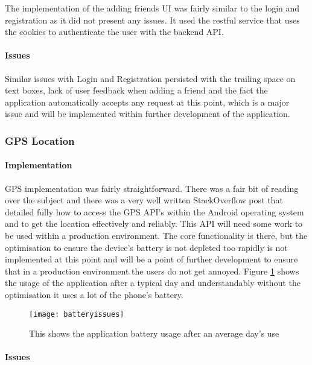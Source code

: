 The implementation of the adding friends UI was fairly similar to the login and registration as it did not present any issues. It used the restful service that uses the cookies to authenticate the user with the backend API.

\paragraph*{Issues}

Similar issues with Login and Registration persisted with the trailing space on text boxes, lack of user feedback when adding a friend and the fact the application automatically accepts any request at this point, which is a major issue and will be implemented within further development of the application.


\subsubsection*{GPS Location}

\paragraph*{Implementation}

GPS implementation was fairly straightforward. There was a fair bit of reading over the subject and there was a very well written StackOverflow post \cite{mudit:HowdoIgetthecurrentGPSlocationprogrammaticallyinAndroid:2009:online} that detailed fully how to access the GPS API's within the Android operating system and to get the location effectively and reliably. This API will need some work to be used within a production environment. The core functionality is there, but the optimisation to ensure the device's battery is not depleted too rapidly is not implemented at this point and will be a point of further development to ensure that in a production environment the users do not get annoyed. Figure \ref{fig:battery_issues} shows the usage of the application after a typical day and understandably without the optimisation it uses a lot of the phone's battery.

\begin{figure}[H]
    \centering
    \texttt{[image: batteryissues]}
    \caption{This shows the application battery usage after an average day's use}
    \label{fig:battery_issues}
\end{figure} 

\paragraph*{Issues}

